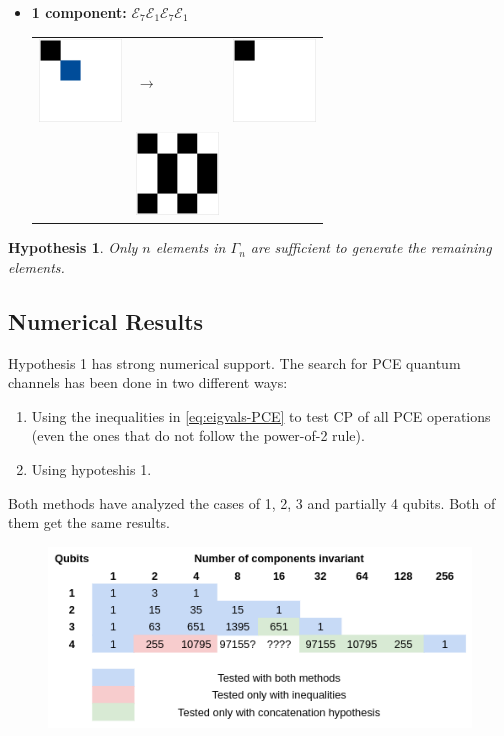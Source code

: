 \documentclass[11pt,dvipsnames]{article} %
\newtheorem{conj}{Hypothesis}
\newcommand{\E}{\mathcal{E}}
\newcommand{\1}{\mathds{1}}
\begin{document}
\begin{itemize}
\pagebreak
\item \textbf{1 component:} $\E_7\E_1\E_7\E_1$\newline
\begin{tabular}{m{2cm} m{2cm} m{2cm}}
\includegraphics[width=2.2cm]{C22}
& \hspace{0.8cm}$\longrightarrow$ 
& \includegraphics[width=2.2cm]{depolarizing} \\ 
 & \includegraphics[width=2.2cm]{img-JA/8To4} &  \\ 
\end{tabular}
\end{itemize}

\begin{conj}
Only $n$ elements in $\Gamma_n$ are sufficient to generate the 
remaining elements.
\end{conj}
\subsection*{Numerical Results} %
Hypothesis 1 has strong numerical support. The search for PCE quantum
channels has been done in two different ways:
\begin{enumerate}
\item Using the inequalities in \eqref{eq:eigvals-PCE} to test CP of 
all PCE operations (even the ones that do not follow the power-of-2 rule).
\item Using hypoteshis 1.
\end{enumerate}
Both methods have analyzed the cases of 1, 2, 3 and partially 4 qubits. 
Both of them get the same results. 

\begin{figure}[H]
  \centering
  \includegraphics[width=.6\textwidth]{cuadro}
\end{figure}
\end{document}
